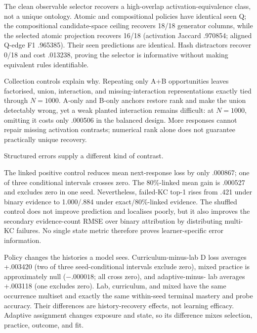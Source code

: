 

The clean observable selector recovers a high-overlap activation-equivalence
class, not a unique ontology.  Atomic and compositional policies have identical
seen Q; the compositional candidate-space ceiling recovers 18/18 generator
columns, while the selected atomic projection recovers 16/18 (activation
Jaccard .970854; aligned Q-edge F1 .965385).  Their seen predictions are
identical.  Hash distractors recover 0/18 and cost .013238, proving the
selector is informative without making equivalent rules identifiable.

Collection controls explain why.  Repeating only A+B opportunities leaves
factorised, union, interaction, and missing-interaction representations exactly
tied through $N=1000$.  A-only and B-only anchors restore rank and make the
union detectably wrong, yet a weak planted interaction remains difficult: at
$N=1000$, omitting it costs only .000506 in the balanced design.  More responses
cannot repair missing activation contrasts; numerical rank alone does not
guarantee practically unique recovery.

Structured errors supply a different kind of contrast.

The linked positive control reduces mean next-response loss by only .000867;
one of three conditional intervals crosses zero.  The 80\%-linked mean gain is
.000527 and excludes zero in one seed.  Nevertheless, failed-KC top-1 rises
from .421 under binary evidence to 1.000/.884 under exact/80\%-linked evidence.
The shuffled control does not improve prediction and localises poorly, but it
also improves the secondary evidence-count RMSE over binary attribution by
distributing multi-KC failures.  No single state metric therefore proves
learner-specific error information.

Policy changes the histories a model sees.  Curriculum-minus-lab D loss
averages +.003420 (two of three seed-conditional intervals exclude zero), mixed
practice is approximately null ($-.000018$; all cross zero), and adaptive-minus-
lab averages +.003118 (one excludes zero).  Lab, curriculum, and mixed have the
same occurrence multiset and exactly the same within-seed terminal mastery and
probe accuracy.  Their differences are history-recovery effects, not learning
efficacy.  Adaptive assignment changes exposure and state, so its difference
mixes selection, practice, outcome, and fit.

